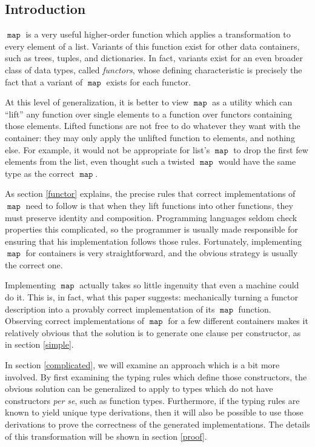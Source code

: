 \documentclass[proof]{article}
\newcommand{\map}{\ensuremath{\mathop{\mathtt{map}}}}
\begin{document}
\begin{multicols}{2}
\section{Introduction}\label{intro}
\vspace{-\parskip}\hspace*{\parindent}$\map$ is a very useful higher-order function which applies a transformation to every element of a list. Variants of this function exist for other data containers, such as trees, tuples, and dictionaries. In fact, variants exist for an even broader class of data types, called \emph{functors}, whose defining characteristic is precisely the fact that a variant of $\map$ exists for each functor.

At this level of generalization, it is better to view $\map$ as a utility which can ``lift'' any function over single elements to a function over functors containing those elements. Lifted functions are not free to do whatever they want with the container: they may only apply the unlifted function to elements, and nothing else. For example, it would not be appropriate for list's $\map$ to drop the first few elements from the list, even thought such a twisted $\map$ would have the same type as the correct $\map$.

As section \ref{functor} explains, the precise rules that correct implementations of $\map$ need to follow is that when they lift functions into other functions, they must preserve identity and composition. Programming languages seldom check properties this complicated, so the programmer is usually made responsible for ensuring that his implementation follows those rules. Fortunately, implementing $\map$ for containers is very straightforward, and the obvious strategy is usually the correct one.

Implementing $\map$ actually takes so little ingenuity that even a machine could do it. This is, in fact, what this paper suggests: mechanically turning a functor description into a provably correct implementation of its $\map$ function. Observing correct implementations of $\map$ for a few different containers makes it relatively obvious that the solution is to generate one clause per constructor, as in section \ref{simple}.

In section \ref{complicated}, we will examine an approach which is a bit more involved. By first examining the typing rules which define those constructors, the obvious solution can be generalized to apply to types which do not have constructors \emph{per se}, such as function types. Furthermore, if the typing rules are known to yield unique type derivations, then it will also be possible to use those derivations to prove the correctness of the generated implementations. The details of this transformation will be shown in section \ref{proof}.


\end{multicols}
\end{document}
